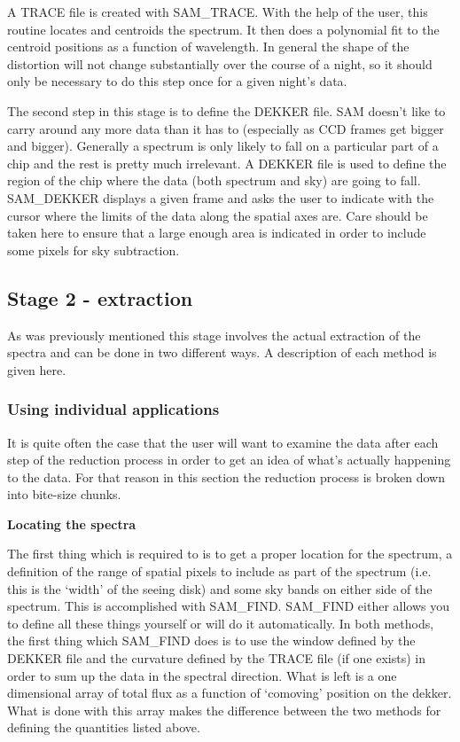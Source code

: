 A TRACE file is created with SAM\_TRACE.  With the help of the  user, this
routine locates and centroids the spectrum.  It then does a  polynomial fit to
the centroid positions as a function of wavelength.  In  general the shape of
the distortion will not change substantially over  the course of a night, so 
it should only be necessary to do this step once for a given night's data.

The second step in this stage is to define the DEKKER file.  SAM doesn't  like
to carry around any more data than it has to (especially as CCD frames get
bigger and bigger).  Generally a spectrum is only likely to fall on a 
particular part of a chip and the rest is pretty much irrelevant.  A  DEKKER
file is used to define the region of the chip where the data (both  spectrum
and sky) are going to fall. SAM\_DEKKER displays a given frame and  asks the
user to indicate with the cursor where the limits of the data  along the
spatial axes are.  Care should be taken here to ensure that a  large enough
area is indicated in order to include some pixels for sky  subtraction.

\subsection{Stage 2 - extraction}

As was previously mentioned this stage involves the actual extraction of  the
spectra and can be done in two different ways.  A description of each method
is given here.

\subsubsection{Using individual applications} \label{subsec:useind}

It is quite often the case that the user will want to examine the data  after
each step of the reduction process in order to get an idea of what's  actually
happening to the data.  For that reason in this section the  reduction process
is broken down into bite-size chunks.

{\bf Locating the spectra}

The first thing which is required to is to get a proper location for the
spectrum, a definition of the range of spatial pixels to include as part of
the spectrum (i.e. this is the `width' of the seeing disk) and some sky bands
on either side of the spectrum.  This is accomplished with SAM\_FIND.
SAM\_FIND either allows you to define all these things yourself or will do it
automatically.  In both methods, the first thing which SAM\_FIND does is to
use the window defined by the DEKKER file and the curvature defined by  the
TRACE file (if one exists) in order to sum up the data in the spectral 
direction.  What is left is a one dimensional array of total flux as a 
function of `comoving' position on the dekker.  What is done with this  array
makes the difference between the two methods for defining the  quantities
listed above.

